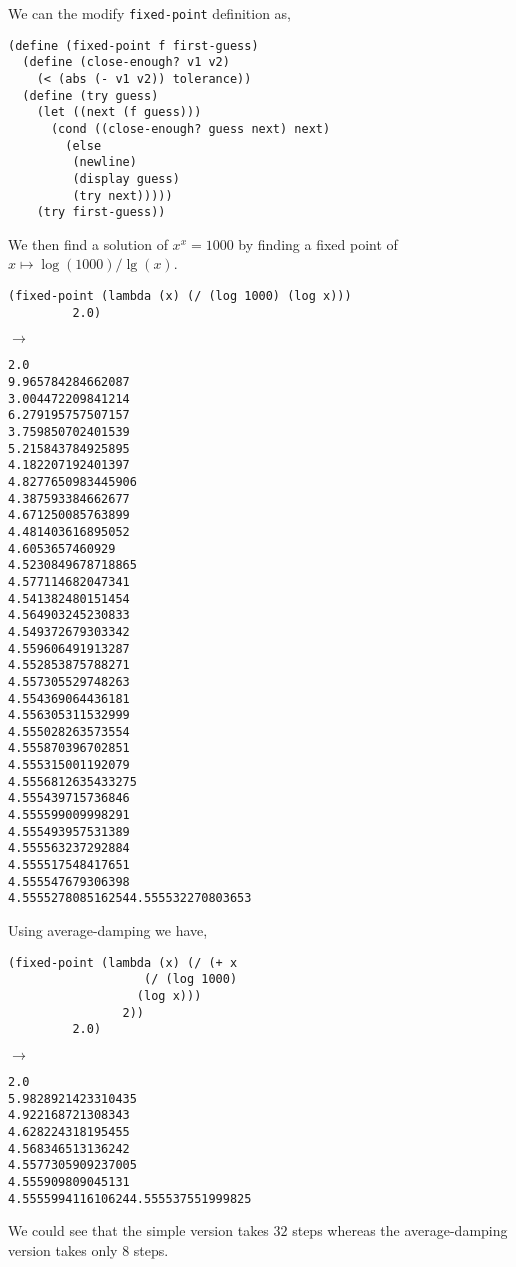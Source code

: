 \documentclass[a4paper,12pt]{article}
\begin{document}
We can the modify \lstinline!fixed-point! definition as,
\begin{lstlisting}
(define (fixed-point f first-guess)
  (define (close-enough? v1 v2)
    (< (abs (- v1 v2)) tolerance))
  (define (try guess)
    (let ((next (f guess)))
      (cond ((close-enough? guess next) next)
	    (else
	     (newline)
	     (display guess)
	     (try next)))))
    (try first-guess))
\end{lstlisting}
We then find a solution of $x^x = 1000$ by finding a fixed point of \\
$x \mapsto \log(1000)/\lg(x)$.
\begin{lstlisting}
(fixed-point (lambda (x) (/ (log 1000) (log x)))
	     2.0)
\end{lstlisting}
$\rightarrow$
\begin{lstlisting}
2.0
9.965784284662087
3.004472209841214
6.279195757507157
3.759850702401539
5.215843784925895
4.182207192401397
4.8277650983445906
4.387593384662677
4.671250085763899
4.481403616895052
4.6053657460929
4.5230849678718865
4.577114682047341
4.541382480151454
4.564903245230833
4.549372679303342
4.559606491913287
4.552853875788271
4.557305529748263
4.554369064436181
4.556305311532999
4.555028263573554
4.555870396702851
4.555315001192079
4.5556812635433275
4.555439715736846
4.555599009998291
4.555493957531389
4.555563237292884
4.555517548417651
4.555547679306398
4.5555278085162544.555532270803653
\end{lstlisting}
Using average-damping we have,
\begin{lstlisting}
(fixed-point (lambda (x) (/ (+ x
			       (/ (log 1000)
				  (log x)))
			    2))
	     2.0) 
\end{lstlisting}
$\rightarrow$
\begin{lstlisting}
2.0
5.9828921423310435
4.922168721308343
4.628224318195455
4.568346513136242
4.5577305909237005
4.555909809045131
4.5555994116106244.555537551999825
\end{lstlisting}
We could see that the simple version takes $32$ steps whereas the
average-damping version takes only $8$ steps.
\end{document}
